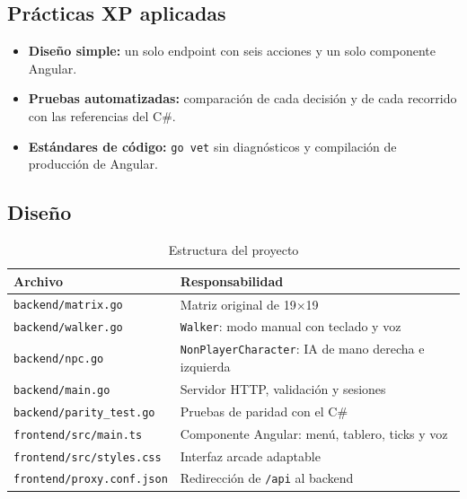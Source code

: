 \documentclass[12pt,a4paper]{article}
\begin{document}
\subsection{Prácticas XP aplicadas}
\begin{itemize}
 \item \textbf{Diseño simple:} un solo endpoint con seis acciones y un solo componente Angular.
 \item \textbf{Pruebas automatizadas:} comparación de cada decisión y de cada recorrido con las referencias del C\#.
 \item \textbf{Estándares de código:} \texttt{go vet} sin diagnósticos y compilación de producción de Angular.
\end{itemize}

\subsection{Diseño}
\begin{table}[H]
\centering\small
\caption{Estructura del proyecto}
\begin{tabular}{p{5.4cm}p{8.2cm}}
\toprule
\textbf{Archivo} & \textbf{Responsabilidad}\\
\midrule
\texttt{backend/matrix.go} & Matriz original de 19$\times$19\\
\texttt{backend/walker.go} & \texttt{Walker}: modo manual con teclado y voz\\
\texttt{backend/npc.go} & \texttt{NonPlayerCharacter}: IA de mano derecha e izquierda\\
\texttt{backend/main.go} & Servidor HTTP, validación y sesiones\\
\texttt{backend/parity\_test.go} & Pruebas de paridad con el C\#\\
\texttt{frontend/src/main.ts} & Componente Angular: menú, tablero, ticks y voz\\
\texttt{frontend/src/styles.css} & Interfaz arcade adaptable\\
\texttt{frontend/proxy.conf.json} & Redirección de \texttt{/api} al backend\\
\bottomrule
\end{tabular}
\end{table}
\end{document}
